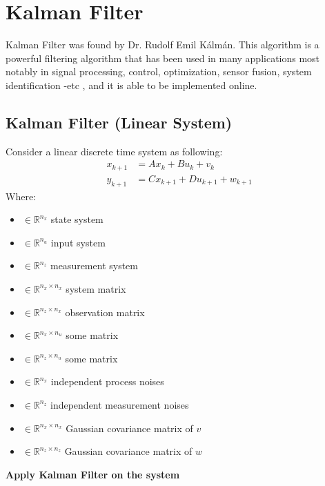 \chapter{Kalman Filter}
Kalman Filter was found by Dr. Rudolf Emil Kálmán. This algorithm is a powerful filtering algorithm that has been used in many applications most notably in signal processing, control, optimization, sensor fusion, system identification -etc , and it is able to be implemented online.

\section{Kalman Filter (Linear System)}
	Consider a linear discrete time system as following:
	\begin{equation}
		\begin{split}
			x_{k+1} &= Ax_k + Bu_k + v_k \\
			y_{k+1} &= Cx_{k+1} + Du_{k+1} + w_{k+1}
		\end{split}
		\label{kfeq1}
	\end{equation}
	Where:
	\begin{itemize}
		\item { \(\in \mathbb{R}^{n_x}\) state system}
		\item { \(\in \mathbb{R}^{n_u}\) input system}
		\item { \(\in \mathbb{R}^{n_z}\) measurement system}
		\item { \(\in \mathbb{R}^{n_x \times n_x}\) system matrix}
		\item { \(\in \mathbb{R}^{n_z \times n_x}\) observation matrix}
		\item { \(\in \mathbb{R}^{n_x \times n_u}\) some matrix}
		\item { \(\in \mathbb{R}^{n_z \times n_u}\) some matrix}
		\item { \(\in \mathbb{R}^{n_x}\) independent process noises}
		\item { \(\in \mathbb{R}^{n_z}\) independent measurement noises}
		\item { \(\in \mathbb{R}^{n_x \times n_x}\) Gaussian covariance matrix of \(v\)}
		\item { \(\in \mathbb{R}^{n_z \times n_z}\) Gaussian covariance matrix of \(w\)}
	\end{itemize}
	\begin{center}
		\textbf{Apply Kalman Filter on the system}
	\end{center}
